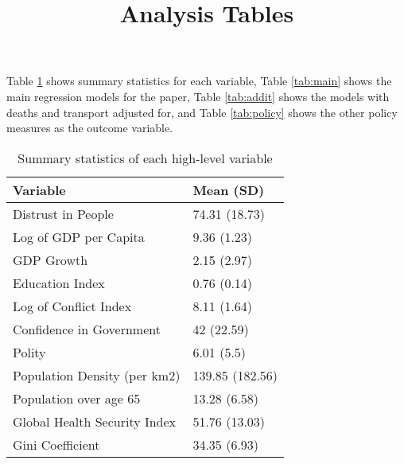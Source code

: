 \documentclass[
]{article}
\title{Analysis Tables}
\author{}
\date{\vspace{-2.5em}}
\begin{document}
\maketitle

Table \ref{tab:stats} shows summary statistics for each variable, Table \ref{tab:main} shows the main regression models for the paper, Table \ref{tab:addit} shows the models with deaths and transport adjusted for, and Table \ref{tab:policy} shows the other policy measures as the outcome variable.

\begin{table}

\caption{\label{tab:stats}Summary statistics of each high-level variable}
\centering
\begin{tabular}[t]{l|l}
\hline
Variable & Mean (SD)\\
\hline
Distrust in People & 74.31 (18.73)\\
\hline
Log of GDP per Capita & 9.36 (1.23)\\
\hline
GDP Growth & 2.15 (2.97)\\
\hline
Education Index & 0.76 (0.14)\\
\hline
Log of Conflict Index & 8.11 (1.64)\\
\hline
Confidence in Government & 42 (22.59)\\
\hline
Polity & 6.01 (5.5)\\
\hline
Population Density (per km2) & 139.85 (182.56)\\
\hline
Population over age 65 & 13.28 (6.58)\\
\hline
Global Health Security Index & 51.76 (13.03)\\
\hline
Gini Coefficient & 34.35 (6.93)\\
\hline
\end{tabular}
\end{table}
\end{document}
